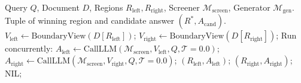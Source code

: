 \begin{algorithm}[t]
\caption{Parallel Boundary Evaluation and Speculative Tiering}
\label{alg:screening}
\begin{footnotesize}
\begin{algorithmic}[1]
\REQUIRE Query $Q$, Document $D$, Regions $R_{\text{left}}, R_{\text{right}}$, Screener $\mathcal{M}_{\text{screen}}$, Generator $\mathcal{M}_{\text{gen}}$.
\ENSURE Tuple of winning region and candidate answer $(R^*, A_{\text{cand}})$.
\STATE $V_{\text{left}} \leftarrow \text{BoundaryView}(D[R_{\text{left}}])$;
\STATE $V_{\text{right}} \leftarrow \text{BoundaryView}(D[R_{\text{right}}])$;
\STATE Run concurrently:
\STATE \quad $A_{\text{left}} \leftarrow \text{CallLLM}(\mathcal{M}_{\text{screen}}, V_{\text{left}}, Q, \mathcal{T}=0.0)$;
\STATE \quad $A_{\text{right}} \leftarrow \text{CallLLM}(\mathcal{M}_{\text{screen}}, V_{\text{right}}, Q, \mathcal{T}=0.0)$;
    \RETURN $(R_{\text{left}}, A_{\text{left}})$;
    \RETURN $(R_{\text{right}}, A_{\text{right}})$;
\ELSE
    \RETURN NIL;
\ENDIF
\end{algorithmic}
\end{footnotesize}
\end{algorithm}

